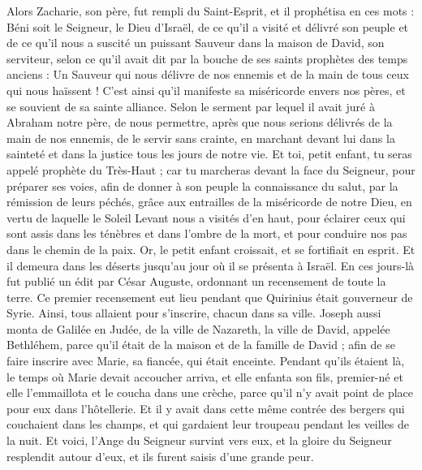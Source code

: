 \begin{multicols}{2}
Alors Zacharie, son père, fut rempli du Saint-Esprit, et il prophétisa en ces mots :
Béni soit le Seigneur, le Dieu d'Israël, de ce qu'il a visité et délivré son peuple
et de ce qu'il nous a suscité un puissant Sauveur dans la maison de David, son serviteur,
selon ce qu'il avait dit par la bouche de ses saints prophètes des temps anciens :
Un Sauveur qui nous délivre de nos ennemis et de la main de tous ceux qui nous haïssent !
C'est ainsi qu'il manifeste sa miséricorde envers nos pères, et se souvient de sa sainte alliance.
Selon le serment par lequel il avait juré à Abraham notre père,
de nous permettre, après que nous serions délivrés de la main de nos ennemis, de le servir sans crainte,
en marchant devant lui dans la sainteté et dans la justice tous les jours de notre vie.
Et toi, petit enfant, tu seras appelé prophète du Très-Haut ; car tu marcheras devant la face du Seigneur, pour préparer ses voies,
afin de donner à son peuple la connaissance du salut, par la rémission de leurs péchés,
grâce aux entrailles de la miséricorde de notre Dieu, en vertu de laquelle le Soleil Levant nous a visités d'en haut,
pour éclairer ceux qui sont assis dans les ténèbres et dans l'ombre de la mort, et pour conduire nos pas dans le chemin de la paix.
Or, le petit enfant croissait, et se fortifiait en esprit. Et il demeura dans les déserts jusqu'au jour où il se présenta à Israël.
\VerseOne{}En ces jours-là fut publié un édit par César Auguste, ordonnant un recensement de toute la terre.
Ce premier recensement eut lieu pendant que Quirinius était gouverneur de Syrie.
Ainsi, tous allaient pour s'inscrire, chacun dans sa ville.
Joseph aussi monta de Galilée en Judée, de la ville de Nazareth, la ville de David, appelée Bethléhem, parce qu'il était de la maison et de la famille de David ;
afin de se faire inscrire avec Marie, sa fiancée, qui était enceinte.
Pendant qu'ils étaient là, le temps où Marie devait accoucher arriva,
et elle enfanta son fils, premier-né et elle l'emmaillota et le coucha dans une crèche, parce qu'il n'y avait point de place pour eux dans l'hôtellerie.
Et il y avait dans cette même contrée des bergers qui couchaient dans les champs, et qui gardaient leur troupeau pendant les veilles de la nuit.
Et voici, l'Ange du Seigneur survint vers eux, et la gloire du Seigneur resplendit autour d'eux, et ils furent saisis d'une grande peur.

\end{multicols}
